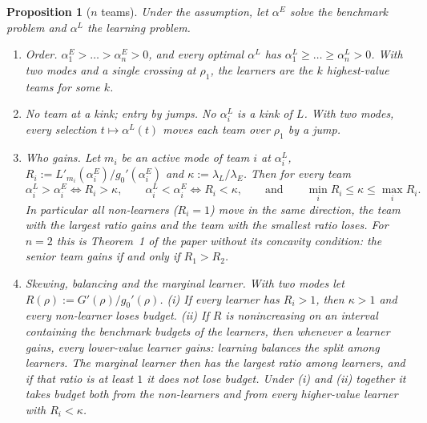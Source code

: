 \documentclass[11pt]{article}
\newtheorem{proposition}{Proposition}
\theoremstyle{definition}
\theoremstyle{remark}
\begin{document}
\begin{proposition}[$n$ teams]\label{prop:nteams}
Under the assumption, let $\alpha^E$ solve the benchmark problem and $\alpha^L$ the learning problem.
\begin{enumerate}
\item[(a)] \emph{Order.} $\alpha^E_1>\dots>\alpha^E_n>0$, and every optimal $\alpha^L$ has $\alpha^L_1\ge\dots\ge\alpha^L_n>0$. With two
modes and a single crossing at $\rho_1$, the learners are the $k$ highest-value teams for some $k$.
\item[(b)] \emph{No team at a kink; entry by jumps.} No $\alpha^L_i$ is a kink of $L$. With two modes, every selection
$t\mapsto\alpha^L(t)$ moves each team over $\rho_1$ by a jump.
\item[(c)] \emph{Who gains.} Let $m_i$ be an active mode of team $i$ at $\alpha^L_i$, $R_i:=L'_{m_i}(\alpha^E_i)/g_0'(\alpha^E_i)$ and
$\kappa:=\lambda_L/\lambda_E$. Then for every team
\[
\alpha^L_i>\alpha^E_i\iff R_i>\kappa,\qquad \alpha^L_i<\alpha^E_i\iff R_i<\kappa,
\qquad\text{and}\qquad \min_iR_i\le\kappa\le\max_iR_i .
\]
In particular all non-learners ($R_i=1$) move in the same direction, the team with the largest ratio gains and the
team with the smallest ratio loses. For $n=2$ this is Theorem~1 of the paper without its concavity condition: the
senior team gains if and only if $R_1>R_2$.
\item[(d)] \emph{Skewing, balancing and the marginal learner.} With two modes let $R(\rho):=G'(\rho)/g_0'(\rho)$.
(i) If every learner has $R_i>1$, then $\kappa>1$ and every non-learner loses budget. (ii) If $R$ is nonincreasing on an
interval containing the benchmark budgets of the learners, then whenever a learner gains, every lower-value learner
gains: learning balances the split among learners. The marginal learner then has the largest ratio among learners,
and if that ratio is at least $1$ it does not lose budget. Under (i) and (ii) together it takes budget both from the
non-learners and from every higher-value learner with $R_i<\kappa$.
\end{enumerate}
\end{proposition}
\end{document}
